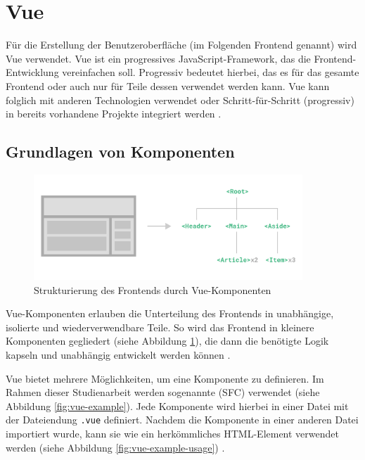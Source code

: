 %
%
\section{Vue}

Für die Erstellung der Benutzeroberfläche (im Folgenden \glqq Frontend\grqq{} genannt) wird Vue verwendet. Vue ist ein progressives JavaScript-Framework, das die Frontend-Entwicklung vereinfachen soll. Progressiv bedeutet hierbei, das es für das gesamte Frontend oder auch nur für Teile dessen verwendet werden kann. Vue kann folglich mit anderen Technologien verwendet oder Schritt-für-Schritt (progressiv) in bereits vorhandene Projekte integriert werden \cite[vgl.][]{VueIntroduction}.

%
%
\subsection{Grundlagen von Komponenten}
\begin{figure}[H]
  \includegraphics[width=0.9\textwidth]{images/vue-components.png}
  \centering
  \caption[Vue-Komponenten]{Strukturierung des Frontends durch Vue-Komponenten \cite{VueComponentBasics}}
  \label{fig:vue-components}
\end{figure}

Vue-Komponenten erlauben die Unterteilung des Frontends in unabhängige, isolierte und wiederverwendbare Teile. So wird das Frontend in kleinere Komponenten gegliedert (siehe Abbildung \ref{fig:vue-components}), die dann die benötigte Logik kapseln und unabhängig entwickelt werden können \cite[vgl.][]{VueComponentBasics}.

Vue bietet mehrere Möglichkeiten, um eine Komponente zu definieren. Im Rahmen dieser Studienarbeit werden sogenannte  (\acs{SFC}) verwendet (siehe Abbildung \ref{fig:vue-example}). Jede Komponente wird hierbei in einer Datei mit der Dateiendung \lstinline{.vue} definiert. Nachdem die Komponente in einer anderen Datei importiert wurde, kann sie wie ein herkömmliches HTML-Element verwendet werden (siehe Abbildung \ref{fig:vue-example-usage}) \cite[vgl.][]{VueComponentBasics}.

